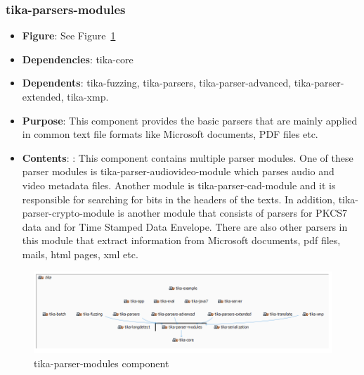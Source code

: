 \documentclass{article}
\begin{document}
\subsubsection{tika-parsers-modules}
\begin {itemize}
\item \textbf{Figure}: See Figure~\ref{fig:tika-parser-modules}
\item \textbf{Dependencies}: tika-core
\item \textbf{Dependents}: tika-fuzzing, tika-parsers, tika-parser-advanced, tika-parser-extended, tika-xmp.
\item \textbf{Purpose}: This component provides the basic parsers that are mainly applied in common text file formats like Microsoft documents, PDF files etc. 
\item \textbf{Contents}: : This component contains multiple parser modules. One of these parser modules is tika-parser-audiovideo-module which parses audio and video metadata files. Another module is tika-parser-cad-module and it is responsible for searching for bits in the headers of the texts. In addition, tika-parser-crypto-module is another module that consists of parsers for PKCS7 data and for Time Stamped Data Envelope. There are also other parsers in this module that extract information from Microsoft documents, pdf files, mails, html pages, xml etc. 
\end{itemize}
\begin{figure}[ht]
    \centering
    \includegraphics[width=1\textwidth]{report/images/tikamodules.PNG}
    \caption{tika-parser-modules component}
    \label{fig:tika-parser-modules}
\end{figure}
\end{document}

